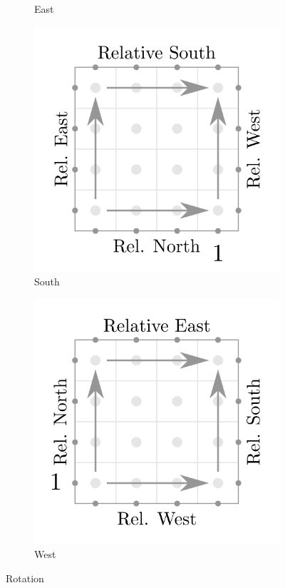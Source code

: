 \documentclass[12pt]{article}
\begin{document}
\begin{figure}
\begin{subfigure}[b]{0.30\textwidth}
        \caption{East}
    \end{subfigure}
    \begin{subfigure}[b]{0.30\textwidth}
        \includegraphics[width=\textwidth]{images/south1.pdf}
        \caption{South}
    \end{subfigure}
    \begin{subfigure}[b]{0.30\textwidth}
        \includegraphics[width=\textwidth]{images/west1.pdf}
        \caption{West}
    \end{subfigure}

    \caption{Rotation}
    \label{rotation}
\end{figure}
\end{document}
